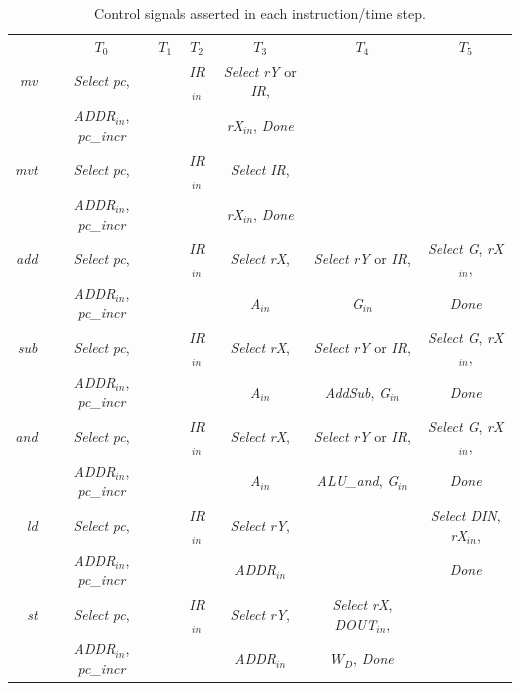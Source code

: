 \documentclass[epsfig,10pt,fullpage]{article} \addtolength{\textwidth}{1.5in}
\begin{document}
\begin{enumerate}
\begin{table}[H]
\begin{center}
\begin{tabular}{r|c|c|c|c|c|c|}
\multicolumn{1}{c}{~} & \multicolumn{1}{c}{$T_0$} & \multicolumn{1}{c}{$T_1$} & \multicolumn{1}{c}{$T_2$} & \multicolumn{1}{c}{$T_3$} & \multicolumn{1}{c}{$T_4$} & \multicolumn{1}{c}{$T_5$} \rule[-0.075in]{0in}{0.25in}\\ \cline{2-7}
{\it mv~} & {\it Select} {\it pc}, & ~ & {\it IR}$_{in}$ & \rule[-0.075in]{0in}{0.25in}{\it Select} {\it rY} or {\it IR}, &  &  \\
~ & {\it ADDR}$_{in}$, {\it pc\_incr} & ~ & ~ & {\it rX$_{in}$}, {\it Done} &  &  \\ \cline{2-7}
{\it mvt~} & {\it Select} {\it pc}, & ~ & {\it IR}$_{in}$ & \rule[-0.075in]{0in}{0.25in}{\it Select} {\it IR}, &  &  \\
~ & {\it ADDR}$_{in}$, {\it pc\_incr} & ~ & ~ & {\it rX$_{in}$}, {\it Done} &  &  \\ \cline{2-7}
\rule[-0.075in]{0in}{0.25in}{\it add~} & {\it Select} {\it
pc}, & ~ & {\it IR}$_{in}$ & {\it Select} {\it rX}, & {\it Select} {\it rY} or {\it IR}, & {\it Select G}, {\it rX$_{in}$}, \\
~ & {\it ADDR}$_{in}$, {\it pc\_incr} & ~ & ~ & {\it A$_{in}$} &  {\it G$_{in}$} & {\it Done} \\
\cline{2-7}
\rule[-0.075in]{0in}{0.25in}{\it sub~} & {\it Select} {\it
pc}, & ~ & {\it IR}$_{in}$ & {\it Select} {\it rX}, & {\it Select} {\it rY} or {\it IR}, & {\it Select G}, {\it rX$_{in}$}, \\
~ & {\it ADDR}$_{in}$, {\it pc\_incr} & ~ & ~ & {\it A$_{in}$} &  {\it AddSub}, {\it G$_{in}$} & {\it Done} \\
\cline{2-7}
\rule[-0.075in]{0in}{0.25in}{\it and~} & {\it Select} {\it
pc}, & ~ & {\it IR}$_{in}$ & {\it Select} {\it rX}, & {\it Select} {\it rY} or {\it IR}, & {\it Select G}, {\it rX$_{in}$}, \\
~ & {\it ADDR}$_{in}$, {\it pc\_incr} & ~ & ~ & {\it A$_{in}$} &  {\it ALU\_and}, {\it G$_{in}$} & {\it Done} \\
\cline{2-7}
\rule[-0.075in]{0in}{0.25in}{\it ld~} & {\it Select} {\it
pc}, & ~ & {\it IR}$_{in}$ & {\it
Select} {\it rY}, &  & {\it Select DIN}, {\it rX$_{in}$}, \\
~ & {\it ADDR}$_{in}$, {\it pc\_incr} & ~ & ~ & {\it ADDR}$_{in}$ &  & {\it Done} \\
\cline{2-7}
\rule[-0.075in]{0in}{0.25in}{\it st~} & {\it Select} {\it
pc}, & ~ & {\it IR}$_{in}$ & {\it
Select} {\it rY}, & {\it Select rX}, {\it DOUT$_{in}$}, & \\
~ & {\it ADDR}$_{in}$, {\it pc\_incr} & ~ & ~ & {\it ADDR$_{in}$} & $W_D$, {\it Done} & \\
\cline{2-7}
\end{tabular}
\caption{Control signals asserted in each instruction/time step.}
\label{tab:control_signals}
\end{center}
\end{table}


\end{enumerate}
\end{document}
